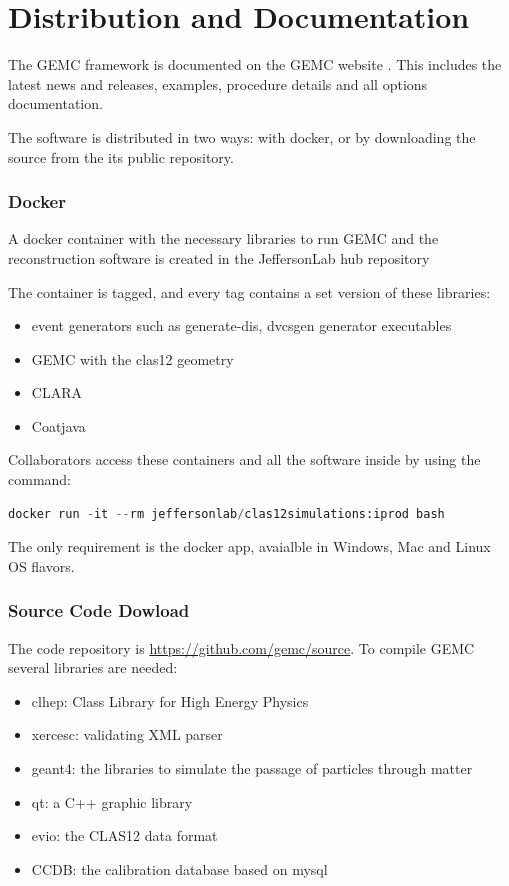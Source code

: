 \section{Distribution and Documentation}

The GEMC framework is documented on the GEMC website \cite{gemc}. This includes the latest news and releases,
examples, procedure details and all options documentation.

The software is distributed in two ways: with docker, or by downloading the source from the its public repository.

\subsubsection{Docker}

A docker container with the necessary libraries to run GEMC and the reconstruction software
is created in the JeffersonLab hub repository \cite{jlabDocker}


The container is tagged, and every tag contains a set version of these libraries:

\begin{itemize}
	\item event generators such as generate-dis, dvcsgen generator executables
	\item GEMC with the clas12 geometry
	\item CLARA
	\item Coatjava
\end{itemize}

Collaborators access these containers and all the software inside by using the command:

\begin{lstlisting}[language=Python]
docker run -it --rm jeffersonlab/clas12simulations:iprod bash
\end{lstlisting}

The only requirement is the docker app, avaialble in Windows, Mac and Linux OS flavors.


\subsubsection{Source Code Dowload}

The code repository is \url{https://github.com/gemc/source}. To compile GEMC several libraries are needed:

\begin{itemize}
	\item clhep: Class Library for High Energy Physics \cite{clhep}
	\item xercesc: validating XML parser \cite{xercesc}
	\item geant4: the libraries to simulate the passage of particles through matter \cite{geant4}
	\item qt: a C++ graphic library \cite{qt}
	\item evio: the CLAS12 data format \cite{evio}
	\item CCDB: the calibration database based on mysql \cite{ccdb}
\end{itemize}


